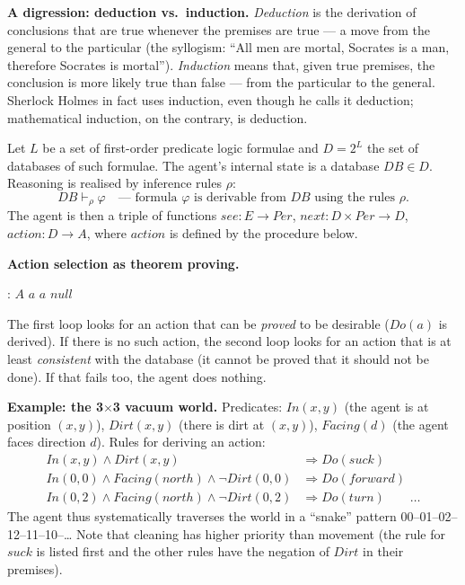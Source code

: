 \documentclass[11pt,a4paper]{article}
\theoremstyle{definition}
\providecommand{\uv}[1]{``#1''}
\begin{document}
\medskip
\noindent\textbf{A digression: deduction vs.\ induction.}
\emph{Deduction} is the derivation of conclusions that are true whenever the premises are true ---
a move from the general to the particular (the syllogism: \uv{All men are mortal, Socrates is a man,
therefore Socrates is mortal}). \emph{Induction} means that, given true premises, the conclusion is
more likely true than false --- from the particular to the general. Sherlock Holmes in fact uses
induction, even though he calls it deduction; mathematical induction, on the contrary, is deduction.

\begin{defbox}
Let $L$ be a set of first-order predicate logic formulae and $D = 2^L$ the set of databases of
such formulae. The agent's internal state is a database $\mathit{DB} \in D$. Reasoning is realised
by inference rules $\rho$:
\[
\mathit{DB} \vdash_\rho \varphi \quad\text{---\ formula } \varphi \text{ is derivable from }
\mathit{DB} \text{ using the rules } \rho .
\]
The agent is then a triple of functions
$\mathit{see} : E \to \mathit{Per}$, $\mathit{next} : D \times \mathit{Per} \to D$,
$\mathit{action} : D \to A$, where $\mathit{action}$ is defined by the procedure below.
\end{defbox}

\noindent\textbf{Action selection as theorem proving.}
\begin{algorithmic}[1]
 : $A$
     \Return $a$ \EndIf
  \EndFor
     \Return $a$ \EndIf
  \EndFor
  \State \Return $\mathit{null}$
\EndFunction
\end{algorithmic}

The first loop looks for an action that can be \emph{proved} to be desirable ($\mathit{Do}(a)$ is
derived). If there is no such action, the second loop looks for an action that is at least
\emph{consistent} with the database (it cannot be proved that it should not be done). If that fails
too, the agent does nothing.

\medskip
\noindent\textbf{Example: the 3$\times$3 vacuum world.}
Predicates: $\mathit{In}(x,y)$ (the agent is at position $(x,y)$), $\mathit{Dirt}(x,y)$ (there is
dirt at $(x,y)$), $\mathit{Facing}(d)$ (the agent faces direction $d$). Rules for deriving an
action:
\begin{align*}
\mathit{In}(x,y) \wedge \mathit{Dirt}(x,y) &\Rightarrow \mathit{Do}(\mathit{suck}) \\
\mathit{In}(0,0) \wedge \mathit{Facing}(\mathit{north}) \wedge \neg\mathit{Dirt}(0,0)
  &\Rightarrow \mathit{Do}(\mathit{forward}) \\
\mathit{In}(0,2) \wedge \mathit{Facing}(\mathit{north}) \wedge \neg\mathit{Dirt}(0,2)
  &\Rightarrow \mathit{Do}(\mathit{turn}) \qquad \dots
\end{align*}
The agent thus systematically traverses the world in a \uv{snake} pattern
00--01--02--12--11--10--\dots
Note that cleaning has higher priority than movement (the rule for $\mathit{suck}$ is listed first
and the other rules have the negation of $\mathit{Dirt}$ in their premises).
\end{document}
